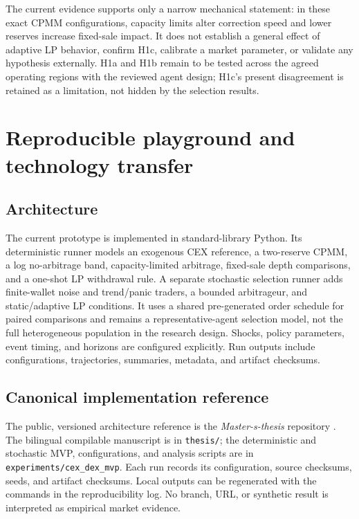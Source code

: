 The current evidence supports only a narrow mechanical statement: in these exact
CPMM configurations, capacity limits alter correction speed and lower reserves
increase fixed-sale impact. It does not establish a general effect of adaptive LP
behavior, confirm H1c, calibrate a market parameter, or validate any hypothesis
externally. H1a and H1b remain to be tested across the agreed operating regions with
the reviewed agent design; H1c's present disagreement is retained as a limitation,
not hidden by the selection results.

\section{Reproducible playground and technology transfer}

\subsection{Architecture}

The current prototype is implemented in standard-library Python. Its deterministic
runner models an exogenous CEX reference, a two-reserve CPMM, a log no-arbitrage band,
capacity-limited arbitrage, fixed-sale depth comparisons, and a one-shot LP withdrawal
rule. A separate stochastic selection runner adds finite-wallet noise and trend/panic
traders, a bounded arbitrageur, and static/adaptive LP conditions. It uses a shared
pre-generated order schedule for paired comparisons and remains a representative-agent
selection model, not the full heterogeneous population in the research design. Shocks,
policy parameters, event timing, and horizons are configured explicitly. Run outputs
include configurations, trajectories, summaries, metadata, and artifact checksums.

\subsection{Canonical implementation reference}

The public, versioned architecture reference is the \textit{Master-s-thesis}
repository \cite{calderon2026repository}. The bilingual compilable manuscript is in
\texttt{thesis/}; the deterministic and stochastic MVP, configurations, and analysis
scripts are in \texttt{experiments/cex\_dex\_mvp}. Each run records its configuration,
source checksums, seeds, and artifact checksums. Local outputs can be regenerated with
the commands in the reproducibility log. No branch, URL, or synthetic result is
interpreted as empirical market evidence.

